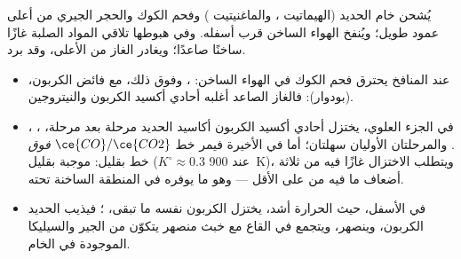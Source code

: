 يُشحن خام الحديد (الهيماتيت ، والماغنيتيت ) وفحم الكوك والحجر
الجيري من أعلى عمود طويل؛ ويُنفخ الهواء الساخن
قرب أسفله. وفي هبوطها تلاقي المواد الصلبة غازًا ساخنًا صاعدًا؛ ويغادر الغاز
من الأعلى، وقد برد.
\begin{itemize}
  \item عند المنافخ يحترق فحم الكوك في الهواء الساخن: ، 
        وفوق ذلك، مع فائض الكربون،  (بودوار): فالغاز
        الصاعد أغلبه أحادي أكسيد الكربون والنيتروجين.
  \item في الجزء العلوي، يختزل أحادي أكسيد الكربون أكاسيد الحديد مرحلة
        بعد مرحلة، ، ،
        . والمرحلتان الأوليان سهلتان؛ أما في الأخيرة
        فيمر خط $\ce{CO}/\ce{CO2}$ \textit{فوق} خط
         بقليل:  موجبة بقليل
        ($K^\circ \approx 0.3$ عند \qty{900}{K})، ويتطلب الاختزال غازًا
        فيه من  ثلاثة أضعاف ما فيه من  على الأقل --- وهو ما
        يوفره  في المنطقة الساخنة تحته.
  \item في الأسفل، حيث الحرارة أشد، يختزل الكربون نفسه ما تبقى، ؛ فيذيب الحديد الكربون، وينصهر، ويتجمع في القاع
        مع خبث منصهر يتكوّن من الجير والسيليكا الموجودة في الخام.
\end{itemize}

